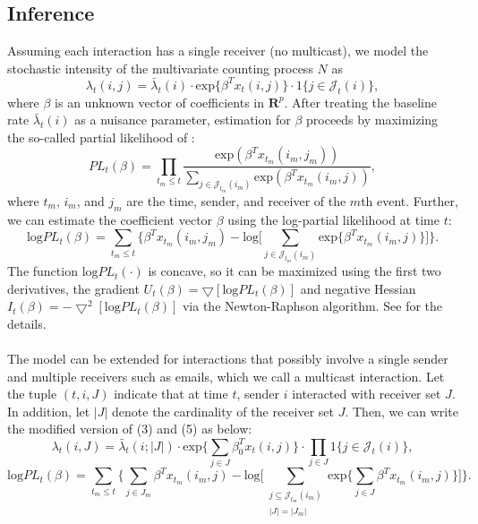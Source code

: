 \documentclass[a4paper]{article}
\begin{document}
\subsection{Inference}
Assuming each interaction has a single receiver (no multicast), we model the stochastic intensity of the multivariate counting process $N$ as \begin{equation}\lambda_t(i,j)=\bar\lambda_t(i)\cdot \mbox{exp}\{\beta^Tx_t(i, j)\}\cdot 1\{j \in \mathcal{J}_t(i)\},
\end{equation} 
where $\beta$ is an unknown vector of coefficients in $\boldsymbol{R}^{p}$. After treating the baseline rate $\bar\lambda_t(i)$ as a nuisance parameter, estimation for $\beta$ proceeds by maximizing the so-called partial likelihood of \cite{cox1992regression}: 
\begin{equation}
PL_t(\beta)=\prod_{t_m\leq t} \frac{\mbox{exp}(\beta^Tx_{t_m}(i_m, j_m))}{\sum_{j\in \mathcal{J}_{t_m}(i_m)} \mbox{exp}(\beta^Tx_{t_m}(i_m, j))},
\end{equation}
where $t_m$, $i_m$, and $j_m$ are the time, sender, and receiver
of the $m$th event.
Further, we can estimate the coefficient vector $\beta$ using the log-partial likelihood at time $t$:
\begin{equation}
\mbox{log}PL_t(\beta)=\sum_{t_m\leq t} \Big\{\beta^Tx_{t_m}(i_m, j_m)-\mbox{log}\big[\sum_{j\in \mathcal{J}_{t_m}(i_m)} \mbox{exp}\{\beta^Tx_{t_m}(i_m, j)\}\big]\Big\}.
\end{equation}
The function $\mbox{log}PL_t(\cdot)$ is concave, so it can be maximized using the first two derivatives, the gradient $U_t(\beta)=\bigtriangledown[\mbox{log}PL_t(\beta)]$ and negative Hessian $I_t(\beta)=-\bigtriangledown^2[\mbox{log}PL_t(\beta)]$ via the Newton-Raphson algorithm. See \cite{PerryWolfe2012} for the details.\\\\
The model can be extended for interactions that possibly involve a single sender and multiple receivers such as emails, which we call a multicast interaction. Let the tuple $(t, i, J)$ indicate that at time $t$, sender $i$ interacted with receiver set $J$. In addition, let $|J|$ denote the cardinality of the receiver set $J$. Then, we can write the modified version of (3) and (5) as below:
\begin{equation}\lambda_t(i,J)=\bar\lambda_t(i; |J|)\cdot \mbox{exp}\{\sum_{j\in J}\beta_0^Tx_t(i, j)\}\cdot\prod_{j\in J} 1\{j \in \mathcal{J}_t(i)\},
\end{equation}
\begin{equation}
\mbox{log}PL_t(\beta)=\sum_{t_m\leq t} \Big\{\sum_{j\in J_m}\beta^Tx_{t_m}(i_m, j)-\mbox{log}\big[\sum_{\substack{j\subseteq \mathcal{J}_{t_m}(i_m)\\|J|=|J_m|}}\mbox{exp}\{\sum_{j\in  J}\beta^Tx_{t_m}(i_m, j)\}\big]\Big\}.
\end{equation}
\end{document}
